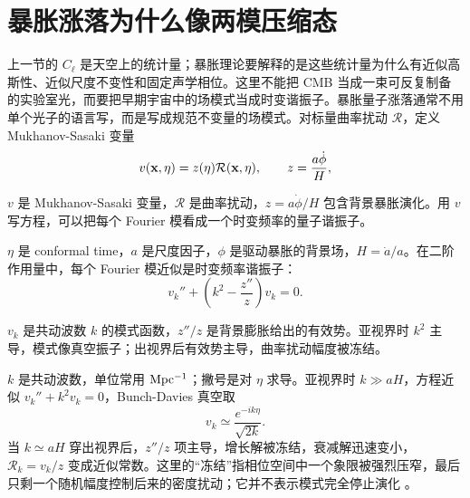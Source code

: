 \section{暴胀涨落为什么像两模压缩态}

上一节的 \(C_\ell\) 是天空上的统计量；暴胀理论要解释的是这些统计量为什么有近似高斯性、近似尺度不变性和固定声学相位。这里不能把 CMB 当成一束可反复制备的实验室光，而要把早期宇宙中的场模式当成时变谐振子。暴胀量子涨落通常不用单个光子的语言写，而是写成规范不变量的场模式。对标量曲率扰动 \(\mathcal R\)，定义 Mukhanov-Sasaki 变量
\begin{equation}
  v({\bf x},\eta)=z(\eta)\mathcal R({\bf x},\eta),
  \qquad
  z=\frac{a\dot\phi}{H},
  \label{eq:ch16-ms-variable}
\end{equation}
\begin{formulaexplain}[公式 (16.6) 解读]
\(v\) 是 Mukhanov-Sasaki 变量，\(\mathcal R\) 是曲率扰动，\(z=a\dot\phi/H\) 包含背景暴胀演化。用 \(v\) 写方程，可以把每个 Fourier 模看成一个时变频率的量子谐振子。
\end{formulaexplain}
\(\eta\) 是 conformal time，\(a\) 是尺度因子，\(\phi\) 是驱动暴胀的背景场，\(H=\dot a/a\)。在二阶作用量中，每个 Fourier 模近似是时变频率谐振子：
\begin{equation}
  v_k''+
  \left(k^2-\frac{z''}{z}\right)v_k
  =
  0 .
  \label{eq:ch16-ms-equation}
\end{equation}
\begin{formulaexplain}[公式 (16.7) 解读]
\(v_k\) 是共动波数 \(k\) 的模式函数，\(z''/z\) 是背景膨胀给出的有效势。亚视界时 \(k^2\) 主导，模式像真空振子；出视界后有效势主导，曲率扰动幅度被冻结。
\end{formulaexplain}
\(k\) 是共动波数，单位常用 \({\rm Mpc^{-1}}\)；撇号是对 \(\eta\) 求导。亚视界时 \(k\gg aH\)，方程近似 \(v_k''+k^2v_k=0\)，Bunch-Davies 真空取
\[
  v_k\simeq \frac{e^{-ik\eta}}{\sqrt{2k}}.
\]
当 \(k\simeq aH\) 穿出视界后，\(z''/z\) 项主导，增长解被冻结，衰减解迅速变小，\(\mathcal R_k=v_k/z\) 变成近似常数。这里的“冻结”指相位空间中一个象限被强烈压窄，最后只剩一个随机幅度控制后来的密度扰动；它并不表示模式完全停止演化 \citep{1988JETP...67.1297M,1990PhRvD..42.3413G,1996CQGra..13..377P}。

